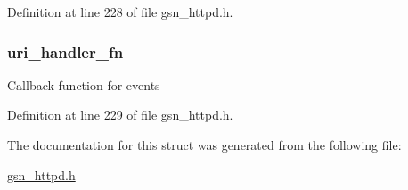 Definition at line 228 of file gsn\_\-httpd.h.

\hypertarget{a00097_a27843141a322f5a72297928e7259f180}{
\subsubsection[{uri\_\-handler\_\-fn}]{ {\bf uri\_\-handler\_\-fn}}}
\label{a00097_a27843141a322f5a72297928e7259f180}
Callback function for events 

Definition at line 229 of file gsn\_\-httpd.h.



The documentation for this struct was generated from the following file:\begin{DoxyCompactItemize}
\item 
\hyperlink{a00508}{gsn\_\-httpd.h}\end{DoxyCompactItemize}
